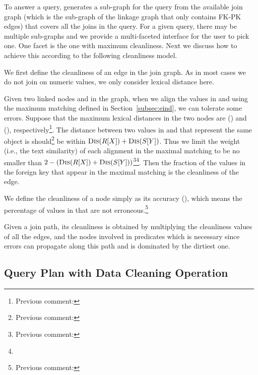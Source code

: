 To answer a query, \dcv generates a sub-graph for the query from the available join graph (which is the sub-graph of the linkage graph that only contains FK-PK edges) that covers all the joins in the query. For a given query, there may be multiple sub-graphs and we provide a multi-faceted interface for the user to pick one. One facet is the one with maximum cleanliness. Next we discuss how to achieve this according to the following cleanliness model.


We first define the cleanliness of an edge in the join graph. As in most cases we do not join on numeric values, we only consider lexical distance here.

Given two linked nodes \RX and \SY in the graph, when we align the values in \RX and \SY using the maximum matching defined in Section~\ref{subsec:eind}, we can tolerate some errors. Suppose that the maximum lexical distances in the two nodes are \Dis(\RX) and \Dis(\SY), respectively\footnote{Previous comment: }. The distance between two values in \RX and \SY that represent the same object is should\footnote{Previous comment:} be within $\textsc{Dis}(R[X]) + \textsc{Dis}(S[Y])$. Thus we limit the weight (i.e., the text similarity) of each alignment in the maximal matching to be no smaller than $2-(\textsc{Dis}(R[X])+\textsc{Dis}(S[Y]))$\footnote{Previous comment: }\footnote{}. Then the fraction of the values in the foreign key that appear in the maximal matching is the cleanliness of the edge. 


We define the cleanliness of a node \RX simply as its accuracy \Acc(\RX), which means the percentage of values in \RX that are not erroneous.\footnote{Previous comment: }

Given a join path, its cleanliness is obtained by multiplying the cleanliness values of all the edges, and the nodes involved in predicates which is necessary since errors can propagate along this path and is dominated by the dirtiest one.



\subsection{Query Plan with Data Cleaning Operation}
\label{subsec:gain}


